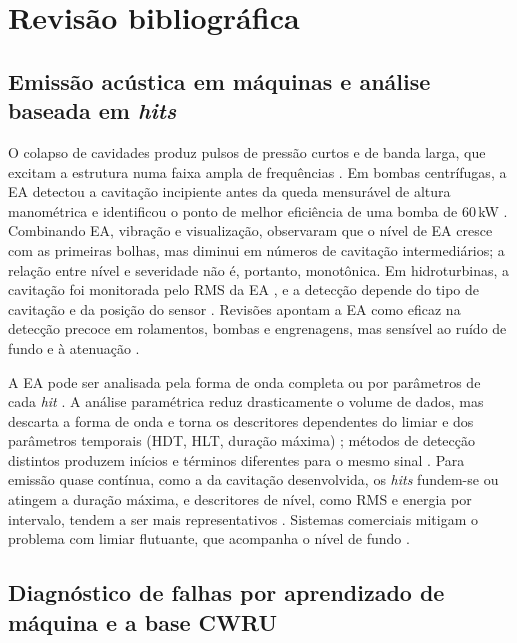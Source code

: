 \documentclass[12pt]{article}
\begin{document}
\section{Revisão bibliográfica}
\label{sec:revisao}

\subsection{Emissão acústica em máquinas e análise baseada em \textit{hits}}
\label{subsec:rev_ea}

O colapso de cavidades produz pulsos de pressão curtos e de banda larga, que excitam a estrutura numa faixa ampla de frequências \cite{brennen1995}. Em bombas centrífugas, a EA detectou a cavitação incipiente antes da queda mensurável de altura manométrica \cite{neill1997} e identificou o ponto de melhor eficiência de uma bomba de 60\,kW \cite{alfayez2005}. Combinando EA, vibração e visualização, \cite{mousmoulis2019} observaram que o nível de EA cresce com as primeiras bolhas, mas diminui em números de cavitação intermediários; a relação entre nível e severidade não é, portanto, monotônica. Em hidroturbinas, a cavitação foi monitorada pelo RMS da EA \cite{derakhshan1991}, e a detecção depende do tipo de cavitação e da posição do sensor \cite{escaler2006}. Revisões apontam a EA como eficaz na detecção precoce em rolamentos, bombas e engrenagens, mas sensível ao ruído de fundo e à atenuação \cite{mba2006,liu2023}.

A EA pode ser analisada pela forma de onda completa ou por parâmetros de cada \textit{hit} \cite{grosse2022}. A análise paramétrica reduz drasticamente o volume de dados, mas descarta a forma de onda e torna os descritores dependentes do limiar e dos parâmetros temporais (HDT, HLT, duração máxima) \cite{unnthorsson2013}; métodos de detecção distintos produzem inícios e términos diferentes para o mesmo sinal \cite{pinal2019}. Para emissão quase contínua, como a da cavitação desenvolvida, os \textit{hits} fundem-se ou atingem a duração máxima, e descritores de nível, como RMS e energia por intervalo, tendem a ser mais representativos \cite{derakhshan1991}. Sistemas comerciais mitigam o problema com limiar flutuante, que acompanha o nível de fundo \cite{vallen2022}.

\subsection{Diagnóstico de falhas por aprendizado de máquina e a base CWRU}
\label{subsec:rev_diagnostico}
\end{document}
